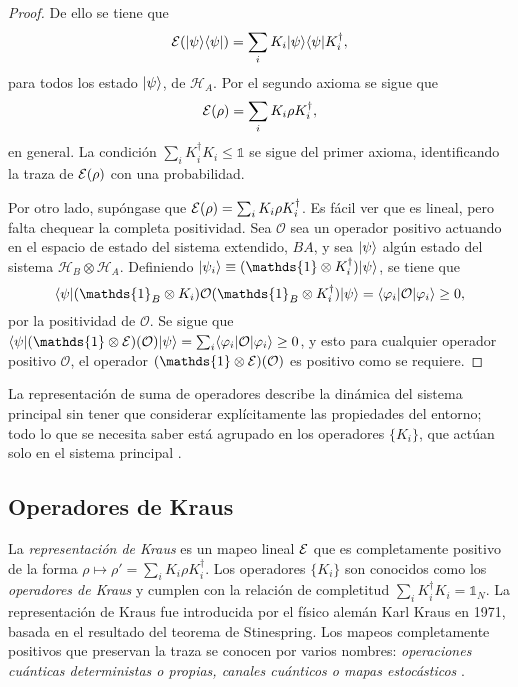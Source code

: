 \begin{proof}
De ello se tiene que  \[\mathcal{E}(|\psi\rangle \langle \psi|)=\sum_i K_i |\psi \rangle \langle \psi |K_i^\dagger,\] para todos los estado $|\psi\rangle$, de $\mathcal{H}_A$. Por el segundo axioma se sigue que \[\mathcal{E}(\rho)=\sum_i K_i \rho K_i^\dagger,\] en general. La condición $\sum_i K_i^\dagger K_i\le \mathds{1}$ se sigue del primer axioma, identificando la traza de $\mathcal{E}(\rho) $ con una probabilidad.


Por otro lado, supóngase que $\mathcal{E}(\rho)=\sum_i K_i \rho K_i^\dagger$. Es fácil ver que es lineal, pero falta chequear la completa positividad. Sea $\mathcal{O}$ sea un operador positivo actuando en el espacio de estado del sistema extendido, $BA$, y sea $|\psi \rangle$ algún estado del sistema $\mathcal{H}_B\otimes \mathcal{H}_A$. Definiendo $|\psi_i\ra \equiv (\mathds{1}\otimes K_i^\dagger)|\psi\ra$, se tiene que \[\la \psi |(\mathds{1}_B\otimes K_i)\mathcal{O}(\mathds{1}_B\otimes K_i^\dagger)|\psi\ra=\la \varphi_i |\mathcal{O}|\varphi_i\ra \ge 0,\] por la positividad de $\mathcal{O}$. Se sigue que $\la \psi| (\mathds{1}\otimes\E)(\mathcal{O})|\psi\ra=\sum_i \la \varphi_i|\mathcal{O}|\varphi_i\ra \ge 0$, y esto para cualquier operador positivo $\mathcal{O}$, el operador $(\mathds{1}\otimes \E)(\mathcal{O})$ es positivo como se requiere.
\end{proof}

La representación de suma de operadores describe la dinámica del sistema principal sin tener que considerar explícitamente las propiedades del entorno; todo lo que se necesita saber está agrupado en los operadores $\{K_i\}$, que actúan solo en el sistema principal {\cite{nielsen_chuang_2010}}.

\subsection{Operadores de Kraus}

 La \textit{representación de Kraus} es un mapeo lineal $\mathcal{E}$ que es completamente positivo de la forma $\rho \mapsto \rho'=\sum_i K_i\rho K_i^\dagger$. Los operadores $\{K_i\}$ son conocidos como los \textit{operadores de Kraus} y cumplen con la relación de completitud $\sum_i K_i^\dagger K_i=\mathds{1}_N$. La representación de Kraus fue introducida por el físico alemán Karl Kraus en 1971, basada en el resultado del teorema de Stinespring. Los mapeos completamente positivos que preservan la traza se conocen por varios nombres: \textit{operaciones cuánticas deterministas o propias, canales cuánticos o mapas estocásticos} {\cite{2007geometry}}.


